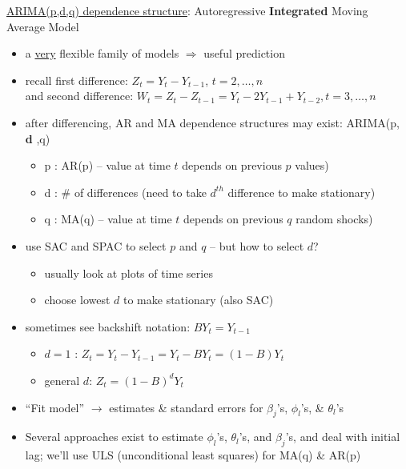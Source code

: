 \documentclass[12pt]{../notes}
\begin{document}
\begin{enumerate}[leftmargin=*]
\underline{ARIMA(p,d,q) dependence structure}:  Autoregressive {\bf Integrated}  Moving Average Model
\begin{itemize}
  \item a \underline{very} flexible family of models  $\Rightarrow$ useful prediction
  \item recall first difference: $Z_t = Y_t - Y_{t-1}$, $t=2,\ldots,n$\\
        and second difference: $W_t  = Z_t - Z_{t-1} = Y_t - 2 Y_{t-1} + Y_{t-2}, \mbox{}t=3,\ldots,n$
  \item after differencing, AR and MA dependence structures may exist: ARIMA(p, {\bf d} ,q)
    \begin{itemize}
      \item p : AR(p) -- value at time $t$ depends on previous $p$ values)
      \item d : \# of differences (need to take $d^{th}$ difference to make stationary)
      \item q : MA(q) -- value at time $t$ depends on previous $q$ random shocks)
    \end{itemize}
  \item use SAC and SPAC to select $p$ and $q$ -- but how to select $d$?
    \begin{itemize}
      \item usually look at plots of time series
      \item choose lowest $d$ to make stationary (also SAC)
    \end{itemize}
  \item sometimes see backshift notation:  $B Y_t = Y_{t-1}$
    \begin{itemize}
      \item $d=1$ : $Z_t = Y_t - Y_{t-1} = Y_t - B Y_t = (1-B) Y_t$
      \item general $d$: $Z_t = (1-B)^d Y_t$\\
    \end{itemize}

  \item ``Fit model'' $\rightarrow$ estimates \& standard errors for $\beta_j$'s, $\phi_l$'s, \& $\theta_l$'s\\

  \item Several approaches exist to estimate $\phi_l$'s, $\theta_l$'s, and $\beta_j$'s, and  deal with initial lag; we'll use
ULS (unconditional least squares) for MA(q) \& AR(p)\\




\end{itemize}
\end{enumerate}
\end{document}
